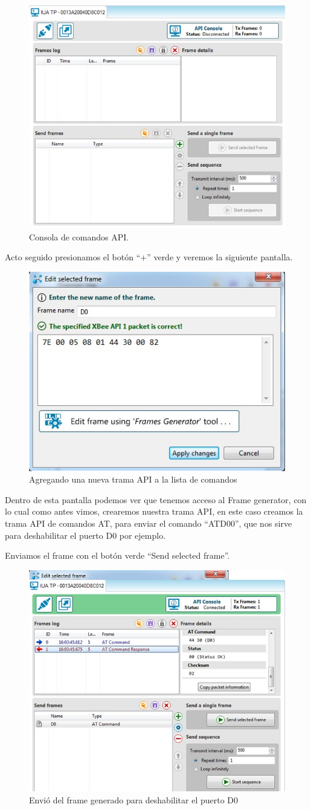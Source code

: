\documentclass[11pt,oneside,spanish,a4paper]{article}
\begin{document}
\begin{figure}[ht]
	\centering
	\includegraphics[width=.6\textwidth]{img/IMAGEN12.jpg}
	\caption{Consola de comandos API.}
\end{figure}
Acto seguido presionamos el botón “+” verde y veremos la siguiente pantalla.
\begin{figure}[h]
	\centering
	\includegraphics[width=.6\textwidth]{img/IMAGEN13.jpg}
	\caption{Agregando una nueva trama API a la lista de comandos}
\end{figure}
Dentro de esta pantalla podemos ver que tenemos acceso al Frame generator, con lo cual como antes vimos, crearemos nuestra trama API, en este caso creamos la trama API de comandos AT, para enviar el comando “ATD00”, que nos sirve para deshabilitar el puerto D0 por ejemplo.

Enviamos el frame con el botón verde “Send selected frame”.

\begin{figure}[h]
	\centering
	\includegraphics[width=.6\textwidth]{img/IMAGEN14.jpg}
	\caption{Envió del frame generado para deshabilitar el puerto D0}
\end{figure}
\end{document}
